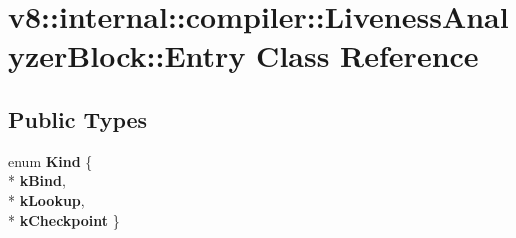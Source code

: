\hypertarget{classv8_1_1internal_1_1compiler_1_1_liveness_analyzer_block_1_1_entry}{}\section{v8\+:\+:internal\+:\+:compiler\+:\+:Liveness\+Analyzer\+Block\+:\+:Entry Class Reference}
\label{classv8_1_1internal_1_1compiler_1_1_liveness_analyzer_block_1_1_entry}
\subsection*{Public Types}
\begin{DoxyCompactItemize}
\item 
enum {\bfseries Kind} \{ \\*
{\bfseries k\+Bind}, 
\\*
{\bfseries k\+Lookup}, 
\\*
{\bfseries k\+Checkpoint}
 \}\hypertarget{classv8_1_1internal_1_1compiler_1_1_liveness_analyzer_block_1_1_entry_ac4341c9ac0a4bf3770f0f3ec8d7cf1b4}{}\label{classv8_1_1internal_1_1compiler_1_1_liveness_analyzer_block_1_1_entry_ac4341c9ac0a4bf3770f0f3ec8d7cf1b4}

\end{DoxyCompactItemize}
